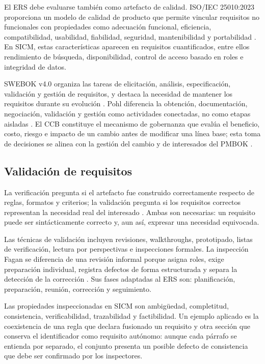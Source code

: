 \documentclass[11pt,a4paper]{article}
\begin{document}
	El ERS debe evaluarse también como artefacto de calidad. ISO/IEC 25010:2023 proporciona un modelo de calidad de producto que permite vincular requisitos no funcionales con propiedades como adecuación funcional, eficiencia, compatibilidad, usabilidad, fiabilidad, seguridad, mantenibilidad y portabilidad \cite{iso25010}. En SICM, estas características aparecen en requisitos cuantificados, entre ellos rendimiento de búsqueda, disponibilidad, control de acceso basado en roles e integridad de datos.
	
	SWEBOK v4.0 organiza las tareas de elicitación, análisis, especificación, validación y gestión de requisitos, y destaca la necesidad de mantener los requisitos durante su evolución \cite{swebok4}. Pohl diferencia la obtención, documentación, negociación, validación y gestión como actividades conectadas, no como etapas aisladas \cite{pohl2025}. El CCB constituye el mecanismo de gobernanza que evalúa el beneficio, costo, riesgo e impacto de un cambio antes de modificar una línea base; esta toma de decisiones se alinea con la gestión del cambio y de interesados del PMBOK \cite{pmbok7}.
	
	\subsection{Validación de requisitos}
	La verificación pregunta si el artefacto fue construido correctamente respecto de reglas, formatos y criterios; la validación pregunta si los requisitos correctos representan la necesidad real del interesado \cite{iso29148,ireb31}. Ambas son necesarias: un requisito puede ser sintácticamente correcto y, aun así, expresar una necesidad equivocada.
	
	Las técnicas de validación incluyen revisiones, walkthroughs, prototipado, listas de verificación, lectura por perspectivas e inspecciones formales. La inspección Fagan se diferencia de una revisión informal porque asigna roles, exige preparación individual, registra defectos de forma estructurada y separa la detección de la corrección \cite{fagan1976}. Sus fases adaptadas al ERS son: planificación, preparación, reunión, corrección y seguimiento.
	
	Las propiedades inspeccionadas en SICM son ambigüedad, completitud, consistencia, verificabilidad, trazabilidad y factibilidad. Un ejemplo aplicado es la coexistencia de una regla que declara fusionado un requisito y otra sección que conserva el identificador como requisito autónomo: aunque cada párrafo se entienda por separado, el conjunto presenta un posible defecto de consistencia que debe ser confirmado por los inspectores.
	
\end{document}
